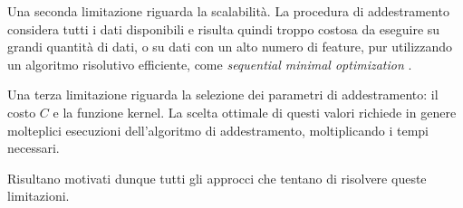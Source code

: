 Una seconda limitazione riguarda la scalabilità. La procedura di addestramento considera tutti i dati disponibili e risulta quindi troppo costosa da eseguire su grandi quantità di dati, o su dati con un alto numero di feature, pur utilizzando un algoritmo risolutivo efficiente, come \emph{sequential minimal optimization} \cite{SMO}.

Una terza limitazione riguarda la selezione dei parametri di addestramento: il costo $C$ e la funzione kernel. La scelta ottimale di questi valori richiede in genere molteplici esecuzioni dell'algoritmo di addestramento, moltiplicando i tempi necessari.

Risultano motivati dunque tutti gli approcci che tentano di risolvere queste limitazioni. 

